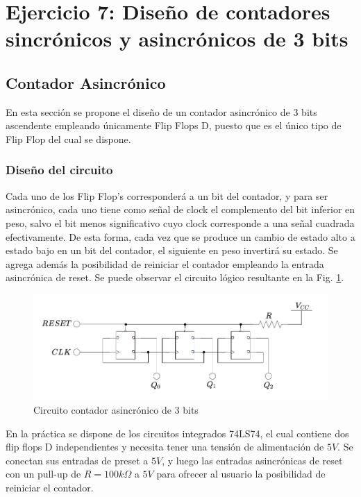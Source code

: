 \section{Ejercicio 7: Dise\~no de contadores sincr\'onicos y asincr\'onicos de 3 bits}

\subsection{Contador Asincr\'onico}
En esta secci\'on se propone el dise\~no de un contador asincr\'onico de 3 bits ascendente empleando \'unicamente Flip Flops D, puesto que es el \'unico tipo de Flip Flop del cual se dispone.

\subsubsection{Dise\~no del circuito}
Cada uno de los Flip Flop's corresponder\'a a un bit del contador, y para ser asincr\'onico, cada uno tiene como se\~nal de clock el complemento del bit inferior en peso, salvo el bit menos significativo cuyo clock
corresponde a una se\~nal cuadrada efectivamente. De esta forma, cada vez que se produce un cambio de estado alto a estado bajo en un bit del contador, el siguiente en peso invertir\'a su estado.
Se agrega adem\'as la posibilidad de reiniciar el contador empleando la entrada asincr\'onica de reset. Se puede observar el circuito l\'ogico resultante en la Fig. \ref{fig:contador_asincronico_circuito}.

\begin{figure}[H]
    \centering
        \includegraphics[scale=0.5]{../EJ7/Recursos/contador_asincronico.png}
    \caption{Circuito contador asincr\'onico de 3 bits}
    \label{fig:contador_asincronico_circuito}
\end{figure}

En la pr\'actica se dispone de los circuitos integrados 74LS74, el cual contiene dos flip flops D independientes y necesita tener una tensi\'on de alimentaci\'on de $5V$.
Se conectan sus entradas de preset a $5V$, y luego las entradas asincr\'onicas de reset con un pull-up de $R = 100k\Omega$ a $5V$ para ofrecer al usuario la posibilidad de reiniciar el contador.

